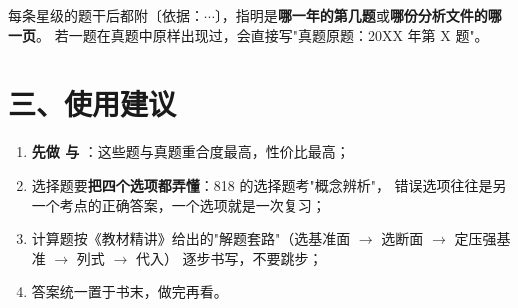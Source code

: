 \noindent 每条星级的题干后都附〔依据：$\cdots$〕，指明是\textbf{哪一年的第几题}或\textbf{哪份分析文件的哪一页}。
若一题在真题中原样出现过，会直接写"真题原题：20XX 年第 X 题"。

\section*{三、使用建议}

\begin{enumerate}
  \item \textbf{先做  与 }：这些题与真题重合度最高，性价比最高；
  \item 选择题要\textbf{把四个选项都弄懂}：818 的选择题考"概念辨析"，
        错误选项往往是另一个考点的正确答案，一个选项就是一次复习；
  \item 计算题按《教材精讲》给出的"解题套路"（选基准面 $\to$ 选断面 $\to$ 定压强基准 $\to$ 列式 $\to$ 代入）
        逐步书写，不要跳步；
  \item 答案统一置于书末，做完再看。
\end{enumerate}
